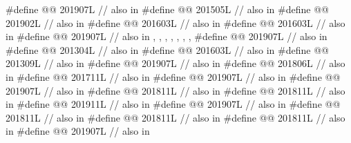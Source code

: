\begin{codeblock}
#define @@                            201907L // also in 
#define @@                     201505L // also in 
#define @@              201902L // also in 
#define @@              201603L // also in 
#define @@                              201603L // also in 
#define @@                           201907L
  // also in , , , , , , , 
#define @@                            201907L // also in 
#define @@                       201304L // also in 
#define @@                             201603L // also in 
#define @@                      201309L // also in 
#define @@                          201907L // also in 
#define @@              201806L // also in 
#define @@                 201711L // also in 
#define @@           201907L // also in 
#define @@              201907L // also in 
#define @@                201811L // also in 
#define @@                  201811L // also in 
#define @@                 201911L // also in 
#define @@                  201907L // also in 
#define @@             201811L // also in 
#define @@                   201811L // also in 
#define @@                 201811L // also in 
#define @@                  201907L // also in 

\end{codeblock}
